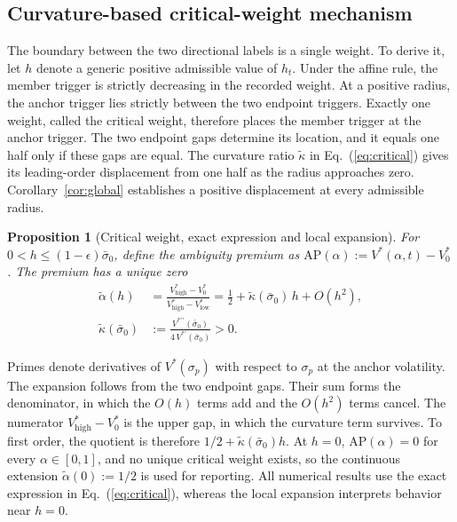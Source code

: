 \documentclass[5p,times,authoryear]{elsarticle}
\theoremstyle{plain}
\newtheorem{proposition}{Proposition}
\newcommand{\sbar}{\bar{\sigma}_0}
\newcommand{\Vlow}{V^{*}_{\mathrm{low}}}
\newcommand{\Vhigh}{V^{*}_{\mathrm{high}}}
\newcommand{\Vzero}{V^{*}_{0}}
\begin{document}
\subsection{Curvature-based critical-weight mechanism}

The boundary between the two directional labels is a single weight. To derive it, let $h$ denote a generic positive admissible value of $h_t$. Under the affine rule, the member trigger is strictly decreasing in the recorded weight. At a positive radius, the anchor trigger lies strictly between the two endpoint triggers. Exactly one weight, called the critical weight, therefore places the member trigger at the anchor trigger. The two endpoint gaps determine its location, and it equals one half only if these gaps are equal. The curvature ratio $\tilde{\kappa}$ in Eq.~(\ref{eq:critical}) gives its leading-order displacement from one half as the radius approaches zero. Corollary~\ref{cor:global} establishes a positive displacement at every admissible radius.

\begin{proposition}[Critical weight, exact expression and local expansion]\label{prop:critical}
For $0<h\le(1-\epsilon)\sbar$, define the ambiguity premium as $\mathrm{AP}(\alpha):=V^{*}(\alpha,t)-\Vzero$. The premium has a unique zero
\begin{equation}
\begin{aligned}
\tilde{\alpha}(h)&=\frac{\Vhigh-\Vzero}{\Vhigh-\Vlow}=\frac{1}{2}+\tilde{\kappa}(\sbar)\,h+O(h^{2}),\\
\tilde{\kappa}(\sbar)&:=\frac{V^{*\prime\prime}(\sbar)}{4\,V^{*\prime}(\sbar)}>0.
\end{aligned}
\label{eq:critical}
\end{equation}
\end{proposition}

Primes denote derivatives of $V^{*}(\sigma_p)$ with respect to $\sigma_p$ at the anchor volatility. The expansion follows from the two endpoint gaps. Their sum forms the denominator, in which the $O(h)$ terms add and the $O(h^{2})$ terms cancel. The numerator $\Vhigh-\Vzero$ is the upper gap, in which the curvature term survives. To first order, the quotient is therefore $1/2+\tilde{\kappa}(\sbar)h$. At $h=0$, $\mathrm{AP}(\alpha)=0$ for every $\alpha\in[0,1]$, and no unique critical weight exists, so the continuous extension $\tilde{\alpha}(0):=1/2$ is used for reporting. All numerical results use the exact expression in Eq.~(\ref{eq:critical}), whereas the local expansion interprets behavior near $h=0$.
\end{document}

